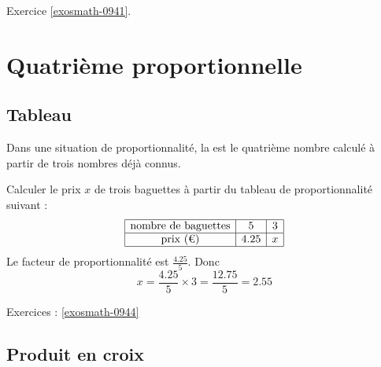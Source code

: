 Exercice \ref{exosmath-0941}.

\section{Quatrième proportionnelle}

\subsection{Tableau}

\begin{definition}
    Dans une situation de proportionnalité, la  est le quatrième nombre calculé à partir de trois nombres déjà connus.
\end{definition}

\begin{example}
    Calculer le prix \( x\) de trois baguettes à partir du tableau de proportionnalité suivant :
    \begin{equation*}
        \begin{array}[]{|c|c|c|}
            \hline
            \text{nombre de baguettes}&5&3\\
            \hline
            \text{prix (€)}&4.25&x\\
            \hline
        \end{array}
    \end{equation*}
    Le facteur de proportionnalité est \( \frac{ 4.25 }{ 5 }\). Donc
    \begin{equation}
        x=\frac{ 4.25 }{ 5 }\times 3=\frac{ 12.75 }{ 5 }=2.55
    \end{equation}
\end{example}

Exercices : \ref{exosmath-0944}

\subsection{Produit en croix}

